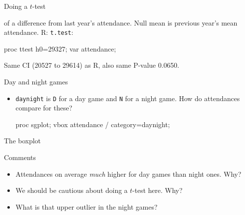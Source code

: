 \documentclass[unknownkeysallowed]{beamer}\usepackage[]{graphicx}\usepackage[]{color}
\begin{document}
\begin{frame}[fragile]{Doing a $t$-test}
  
  of a difference from last year's attendance. Null mean is previous
  year's mean attendance. R: \texttt{t.test}:
  
  \begin{Sascode}[store=ia]
proc ttest h0=29327;
  var attendance;
  \end{Sascode}

  
  Same CI (20527 to 29614) as R, also same P-value 0.0650.

\end{frame}



\begin{frame}[fragile]{Day and night games}
  
  \begin{itemize}
  \item \texttt{daynight} is \texttt{D} for a day game and \texttt{N} for
    a night game. How do attendances compare for these?
\begin{Sascode}[store=id]
  proc sgplot;
    vbox attendance / category=daynight;
\end{Sascode}
  \end{itemize}
  
\end{frame}

\begin{frame}[fragile]{The boxplot}
  
  
\end{frame}


\begin{frame}[fragile]{Comments}
  
  \begin{itemize}
  \item Attendances on average \emph{much} higher for day games than
    night ones. Why?
  \item We should be cautious about doing a $t$-test here. Why?
  \item What is that upper outlier in the night games?
  \end{itemize}
  
\end{frame}
\end{document}
